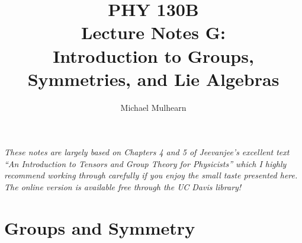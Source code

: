 \documentclass[12pt]{article}
\begin{document}
\title{PHY 130B \\ Lecture Notes G: \\
Introduction to Groups, Symmetries, and Lie Algebras\\}
\author{Michael Mulhearn}

\maketitle

\setcounter{exercise}{0}

\newcommand{\exercise}{
\stepcounter{exercise}
\noindent
{\bf Exercise G.\theexercise:}
}

\noindent
{\it These notes are largely based on Chapters 4 and 5 of Jeevanjee's
  excellent text ``An Introduction to Tensors and Group Theory for
  Physicists'' which I highly recommend working through carefully if
  you enjoy the small taste presented here.  The online version is
  available free through the UC Davis library!}

%
%

\section{Groups and Symmetry}
\end{document}
